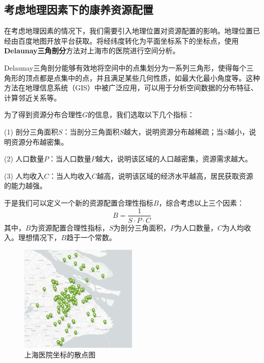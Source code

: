 \documentclass[12pt,a4paper]{article}
\begin{document}
\begin{multicols}{2}
\subsection{考虑地理因素下的康养资源配置}

在考虑地理因素的情况下，我们需要引入地理位置对资源配置的影响。地理位置已经由百度地图开放平台获取。将经纬度转化为平面坐标系下的坐标点，使用\textbf{Delaunay三角剖分}方法对上海市的医院进行空间分析。

Delaunay三角剖分能够有效地将空间中的点集划分为一系列三角形，使得每个三角形的顶点都是点集中的点，并且满足某些几何性质，如最大化最小角度等。这种方法在地理信息系统（GIS）中被广泛应用，可以用于分析空间数据的分布特征、计算邻近关系等。

为了得到资源分布合理性$G$的信息，我们选取以下几个指标：

(1) 剖分三角面积$S$：当剖分三角面积$S$越大，说明资源分布越稀疏；当$S$越小，说明资源分布越密集。

(2) 人口数量$P$：当人口数量$P$越大，说明该区域的人口越密集，资源需求越大。

(3) 人均收入$C$：当人均收入$C$越高，说明该区域的经济水平越高，居民获取资源的能力越强。

于是我们可以定义一个新的资源配置合理性指标$B$，综合考虑以上三个因素：
\[
B = \frac{1}{S\cdot P \cdot C}
\]
其中，$B$为资源配置合理性指标，$S$为剖分三角面积，$P$为人口数量，$C$为人均收入。理想情况下，$B$趋于一个常数。

\begin{figure}[H] %
\centering %
\includegraphics[width=0.5\textwidth]{images/shanghai_hospital_location.jpg} %
\caption{上海医院坐标的散点图} %
\label{Fig.main2} %
\end{figure}


\end{multicols}
\end{document}
